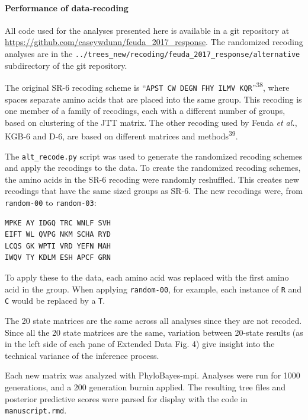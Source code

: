 \documentclass[]{article}
\let\oldparagraph\paragraph
\renewcommand{\paragraph}[1]{\oldparagraph{#1}\mbox{}}
\begin{document}
\hypertarget{performance-of-data-recoding}{%
\paragraph{Performance of
data-recoding}\label{performance-of-data-recoding}}

All code used for the analyses presented here is available in a git
repository at \url{https://github.com/caseywdunn/feuda_2017_response}.
The randomized recoding analyses are in the
\texttt{../trees\_new/recoding/feuda\_2017\_response/alternative}
subdirectory of the git repository.

The original SR-6 recoding scheme is
``\texttt{APST\ CW\ DEGN\ FHY\ ILMV\ KQR}''\textsuperscript{38}, where
spaces separate amino acids that are placed into the same group. This
recoding is one member of a family of recodings, each with a different
number of groups, based on clustering of the JTT matrix. The other
recoding used by Feuda \emph{et al.}, KGB-6 and D-6, are based on
different matrices and methods\textsuperscript{39}.

The \texttt{alt\_recode.py} script was used to generate the randomized
recoding schemes and apply the recodings to the data. To create the
randomized recoding schemes, the amino acids in the SR-6 recoding were
randomly reshuffled. This creates new recodings that have the same sized
groups as SR-6. The new recodings were, from \texttt{random-00} to
\texttt{random-03}:

\begin{verbatim}
MPKE AY IDGQ TRC WNLF SVH
EIFT WL QVPG NKM SCHA RYD
LCQS GK WPTI VRD YEFN MAH
IWQV TY KDLM ESH APCF GRN
\end{verbatim}

To apply these to the data, each amino acid was replaced with the first
amino acid in the group. When applying \texttt{random-00}, for example,
each instance of \texttt{R} and \texttt{C} would be replaced by a
\texttt{T}.

The 20 state matrices are the same across all analyses since they are
not recoded. Since all the 20 state matrices are the same, variation
between 20-state results (as in the left side of each pane of Extended
Data Fig. 4) give insight into the technical variance of the inference
process.

Each new matrix was analyzed with PhyloBayes-mpi. Analyses were run for
1000 generations, and a 200 generation burnin applied. The resulting
tree files and posterior predictive scores were parsed for display with
the code in \texttt{manuscript.rmd}.
\end{document}
